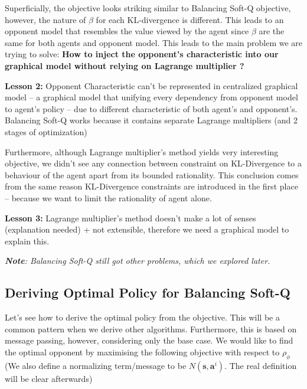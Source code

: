 Superficially, the objective looks striking similar to Balancing Soft-Q objective, however, the nature of $\beta$ for each KL-divergence is different.  This leads to an opponent model that resembles the value viewed by the agent since $\beta$ are the same for both agents and opponent model. This leads to the main problem we are trying to solve: \textbf{How to inject the opponent's characteristic into our graphical model without relying on Lagrange multiplier ?}

\begin{tcolorbox}
\textbf{Lesson 2: } Opponent Characteristic can't be represented in centralized graphical model -- a graphical model that unifying every dependency from opponent model to agent's policy -- due to different characteristic of both agent's and opponent's. Balancing Soft-Q works because it contains separate Lagrange multipliers (and 2 stages of optimization)
\end{tcolorbox}

Furthermore, although Lagrange multiplier's method yields very interesting objective, we didn't see any connection between constraint on KL-Divergence to a behaviour of the agent apart from its bounded rationality. This conclusion comes from the same reason KL-Divergence constraints are introduced in the first place -- because we want to limit the rationality of agent alone. 

\begin{tcolorbox}
\textbf{Lesson 3: }Lagrange multiplier's method doesn't make a lot of senses (explanation needed) + not extensible, therefore we need a graphical model to explain this.
\end{tcolorbox}
\emph{\textbf{Note}: Balancing Soft-Q still got other problems, which we explored later.}  

\subsection{Deriving Optimal Policy for Balancing Soft-Q}
Let's see how to derive the optimal policy from the objective. This will be a common pattern when we derive other algorithms. Furthermore, this is based on \cite{levine2018reinforcement} message passing, however, considering only the base case. We would like to find the optimal opponent by maximising the following objective with respect to $\rho_{\phi}$ (We also define a normalizing term/message to be $N(\boldsymbol{s}, \boldsymbol{a}^i)$. The real definition will be clear afterwards)

